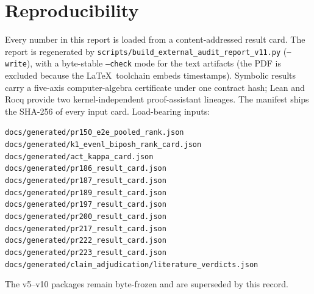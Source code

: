 \documentclass[11pt]{article}
\newcommand{\code}[1]{\texttt{#1}}
\begin{document}
\section{Reproducibility}
\label{sec:repro}
Every number in this report is loaded from a content-addressed result card. The
report is regenerated by \code{scripts/build\_external\_audit\_report\_v11.py}
(\code{--write}), with a byte-stable \code{--check} mode for the text artifacts
(the PDF is excluded because the \LaTeX\ toolchain embeds timestamps). Symbolic
results carry a five-axis computer-algebra certificate under one contract hash;
Lean and Rocq provide two kernel-independent proof-assistant lineages. The
manifest ships the SHA-256 of every input card. Load-bearing inputs:
\begin{flushleft}\small
\code{docs/generated/pr150\_e2e\_pooled\_rank.json} \\
\code{docs/generated/k1\_evenl\_biposh\_rank\_card.json} \\
\code{docs/generated/act\_kappa\_card.json} \\
\code{docs/generated/pr186\_result\_card.json} \\
\code{docs/generated/pr187\_result\_card.json} \\
\code{docs/generated/pr189\_result\_card.json} \\
\code{docs/generated/pr197\_result\_card.json} \\
\code{docs/generated/pr200\_result\_card.json} \\
\code{docs/generated/pr217\_result\_card.json} \\
\code{docs/generated/pr222\_result\_card.json} \\
\code{docs/generated/pr223\_result\_card.json} \\
\code{docs/generated/claim\_adjudication/literature\_verdicts.json} \\
\end{flushleft}
The v5--v10 packages remain byte-frozen and are superseded by this record.
\end{document}
